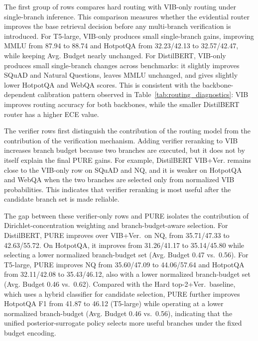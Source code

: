 \documentclass[a4paper,fleqn]{cas-dc}
\begin{document}
The first group of rows compares hard routing with VIB-only routing under single-branch inference. This comparison measures whether the evidential router improves the base retrieval decision before any multi-branch verification is introduced. For T5-large, VIB-only produces small single-branch gains, improving MMLU from 87.94 to 88.74 and HotpotQA from 32.23/42.13 to 32.57/42.47, while keeping Avg. Budget nearly unchanged. For DistilBERT, VIB-only produces small single-branch changes across benchmarks: it slightly improves SQuAD and Natural Questions, leaves MMLU unchanged, and gives slightly lower HotpotQA and WebQA scores. This is consistent with the backbone-dependent calibration pattern observed in Table~\ref{tab:routing_diagnostics}: VIB improves routing accuracy for both backbones, while the smaller DistilBERT router has a higher ECE value.

The verifier rows first distinguish the contribution of the routing model from the contribution of the verification mechanism. Adding verifier reranking to VIB increases branch budget because two branches are executed, but it does not by itself explain the final PURE gains. For example, DistilBERT VIB+Ver. remains close to the VIB-only row on SQuAD and NQ, and it is weaker on HotpotQA and WebQA when the two branches are selected only from normalized VIB probabilities. This indicates that verifier reranking is most useful after the candidate branch set is made reliable.

The gap between these verifier-only rows and PURE isolates the contribution of Dirichlet-concentration weighting and branch-budget-aware selection. For DistilBERT, PURE improves over VIB+Ver.\ on NQ, from 35.71/47.33 to 42.63/55.72. On HotpotQA, it improves from 31.26/41.17 to 35.14/45.80 while selecting a lower normalized branch-budget set (Avg. Budget 0.47 vs.\ 0.56). For T5-large, PURE improves NQ from 35.60/47.09 to 44.06/57.64 and HotpotQA from 32.11/42.08 to 35.43/46.12, also with a lower normalized branch-budget set (Avg. Budget 0.46 vs.\ 0.62). Compared with the Hard top-2+Ver.\ baseline, which uses a hybrid classifier for candidate selection, PURE further improves HotpotQA F1 from 41.87 to 46.12 (T5-large) while operating at a lower normalized branch-budget (Avg. Budget 0.46 vs.\ 0.56), indicating that the unified posterior-surrogate policy selects more useful branches under the fixed budget encoding.
\end{document}
